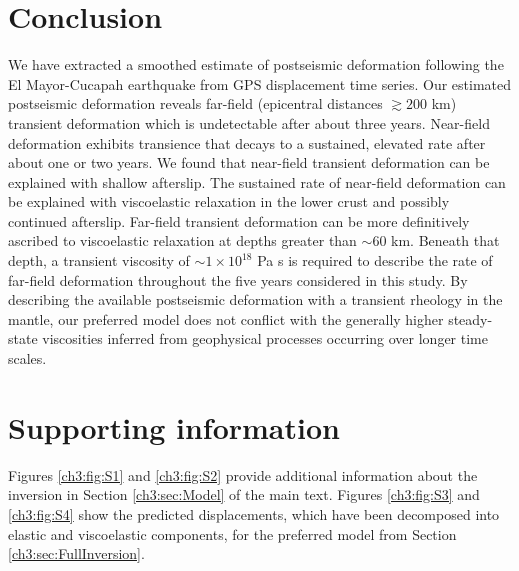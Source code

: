 \section{Conclusion}
We have extracted a smoothed estimate of postseismic deformation
following the El Mayor-Cucapah earthquake from GPS displacement time
series.  Our estimated postseismic deformation reveals far-field
(epicentral distances ${\gtrsim}200$ km) transient deformation which
is undetectable after about three years. Near-field deformation
exhibits transience that decays to a sustained, elevated rate after
about one or two years.  We found that near-field transient
deformation can be explained with shallow afterslip.  The sustained
rate of near-field deformation can be explained with viscoelastic
relaxation in the lower crust and possibly continued afterslip.
Far-field transient deformation can be more definitively ascribed to
viscoelastic relaxation at depths greater than ${\sim}60$ km. Beneath
that depth, a transient viscosity of ${\sim}1\times10^{18}$ Pa s is
required to describe the rate of far-field deformation throughout the
five years considered in this study.  By describing the available
postseismic deformation with a transient rheology in the mantle, our
preferred model does not conflict with the generally higher
steady-state viscosities inferred from geophysical processes occurring
over longer time scales.

\section{Supporting information}
Figures \ref{ch3:fig:S1} and \ref{ch3:fig:S2} provide additional
information about the inversion in Section \ref{ch3:sec:Model} of the
main text. Figures \ref{ch3:fig:S3} and \ref{ch3:fig:S4} show the
predicted displacements, which have been decomposed into elastic and
viscoelastic components, for the preferred model from Section
\ref{ch3:sec:FullInversion}.

